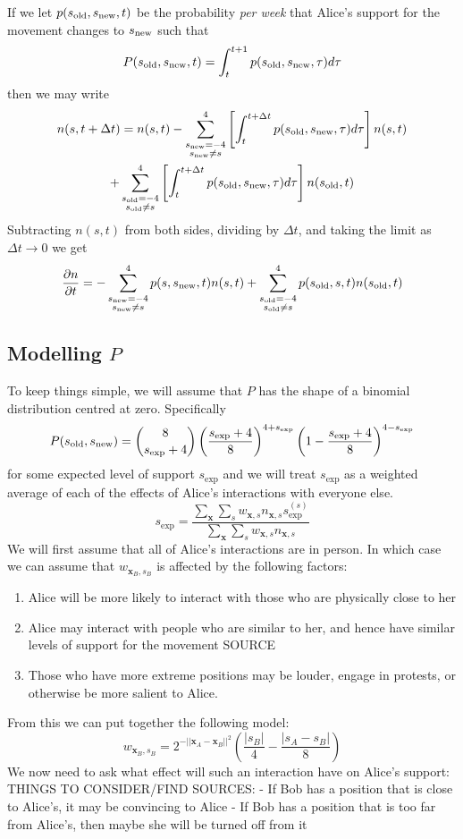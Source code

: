 \documentclass{article}
\begin{document}
    If we let $p(s_{\text{old}},s_{\text{new}},t)$ be the probability \emph{per week} that Alice's support for the movement changes to $s_{\text{new}}$ such that
    \[
        P(s_{\text{old}}, s_{\text{new}}, t) = \int_t^{t+1} p(s_{\text{old}},s_{\text{new}},\tau)d\tau
    \]
    then we may write
    \begin{multline*}
        n(s,t+\Delta t)=n(s,t)-\sum_{\substack{s_{\text{new}}=-4\\ s_{\text{new}}\ne s}}^4 \left[\int_t^{t+\Delta t} p(s_{\text{old}},s_{\text{new}},\tau)d\tau\right]n(s,t)\\+\sum_{\substack{s_{\text{old}}=-4 \\ s_{\text{old}}\ne s}}^{4}\left[\int_t^{t+\Delta t} p(s_{\text{old}},s_{\text{new}},\tau)d\tau\right] n(s_{\text{old}},t)
    \end{multline*}
    Subtracting $n(s,t)$ from both sides, dividing by $\Delta t$, and taking the limit as $\Delta t\to 0$ we get
    \[
        \diffp n t=-\sum_{\substack{\snew=-4\\ \snew\ne s}}^4 p(s,\snew,t)n(s,t)+\sum_{\substack{\sold=-4 \\ \sold\ne s}}^{4} p(\sold,s,t) n(\sold,t)
    \]
    \subsection{Modelling $P$}
    \newcommand{\sexp}{s_{\text{exp}}}
    To keep things simple, we will assume that $P$ has the shape of a binomial distribution centred at zero. Specifically
    \[
        P(\sold,\snew)=\binom 8 {\sexp+4} \left(\frac{\sexp+4} 8\right)^{4+\sexp}\left(1-\frac {\sexp+4} 8\right)^{4-\sexp}
    \]
    for some expected level of support $\sexp$ and we will treat $\sexp$ as a weighted average of each of the effects of Alice's interactions with everyone else. 
    \[
        \sexp = \frac{\sum_{\bm x} \sum_s w_{\bm x,s}n_{\bm x, s} \sexp^{(s)}}{\sum_{\bm x}\sum_s w_{\bm x,s}n_{\bm x, s}}
    \]
    We will first assume that all of Alice's interactions are in person. In which case we can assume that $w_{\bm x_B, s_B}$ is affected by the following factors:
    \begin{enumerate}
        \item Alice will be more likely to interact with those who are physically close to her
        \item Alice may interact with people who are similar to her, and hence have similar levels of support for the movement SOURCE
        \item Those who have more extreme positions may be louder, engage in protests, or otherwise be more salient to Alice. 
    \end{enumerate}
    From this we can put together the following model:
    \[
        w_{\bm x_B, s_B}=2^{-||\bm x_A-\bm x_B||^2} \left(\frac{|s_B|} 4-\frac {|s_A-s_B|} 8\right)
    \]
    We now need to ask what effect will such an interaction have on Alice's support: 
    THINGS TO CONSIDER/FIND SOURCES:
    - If Bob has a position that is close to Alice's, it may be convincing to Alice
    - If Bob has a position that is too far from Alice's, then maybe she will be turned off from it
    
\end{document}
